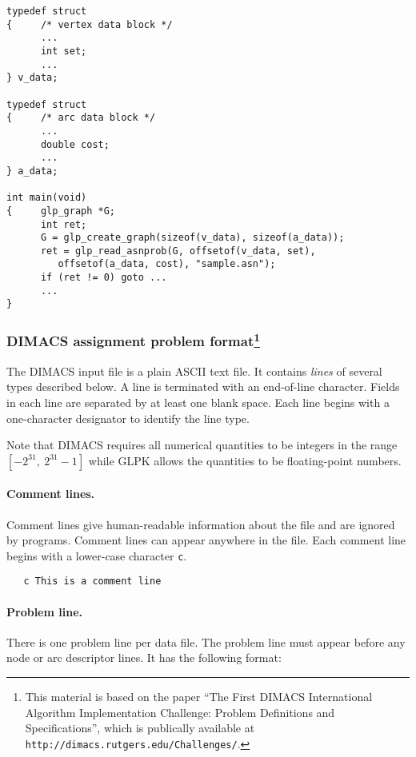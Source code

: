\begin{footnotesize}
\begin{verbatim}
typedef struct
{     /* vertex data block */
      ...
      int set;
      ...
} v_data;

typedef struct
{     /* arc data block */
      ...
      double cost;
      ...
} a_data;

int main(void)
{     glp_graph *G;
      int ret;
      G = glp_create_graph(sizeof(v_data), sizeof(a_data));
      ret = glp_read_asnprob(G, offsetof(v_data, set),
         offsetof(a_data, cost), "sample.asn");
      if (ret != 0) goto ...
      ...
}
\end{verbatim}
\end{footnotesize}

\subsubsection*{DIMACS assignment problem format\footnote{This
material is based on the paper ``The First DIMACS International
Algorithm Implementation Challenge: Problem Definitions and
Specifications'', which is publically available at
{\tt http://dimacs.rutgers.edu/Challenges/}.}}
\label{subsecasnprob}

The DIMACS input file is a plain ASCII text file. It contains
{\it lines} of several types described below. A line is terminated with
an end-of-line character. Fields in each line are separated by at least
one blank space. Each line begins with a one-character designator to
identify the line type.

Note that DIMACS requires all numerical quantities to be integers in
the range $[-2^{31},\ 2^{31}-1]$ while GLPK allows the quantities to be
floating-point numbers.

\paragraph{Comment lines.} Comment lines give human-readable information
about the file and are ignored by programs. Comment lines can appear
anywhere in the file. Each comment line begins with a lower-case
character \verb|c|.

\begin{verbatim}
   c This is a comment line
\end{verbatim}

\newpage

\paragraph{Problem line.} There is one problem line per data file. The
problem line must appear before any node or arc descriptor lines. It has
the following format:

